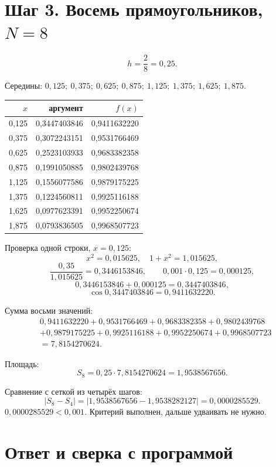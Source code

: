 \documentclass[11pt,a4paper]{article}
\begin{document}
\section*{Шаг 3. Восемь прямоугольников, \(N = 8\)}

\[
h = \frac{2}{8} = 0{,}25.
\]

Середины: \(0{,}125;\ 0{,}375;\ 0{,}625;\ 0{,}875;\ 1{,}125;\ 1{,}375;\ 1{,}625;\ 1{,}875\).

{\small
\begin{center}
\begin{tabular}{@{}r r r@{}}
\toprule
\(x\) & аргумент & \(f(x)\) \\
\midrule
0,125 & 0,3447403846 & 0,9411632220 \\
0,375 & 0,3072243151 & 0,9531766469 \\
0,625 & 0,2523103933 & 0,9683382358 \\
0,875 & 0,1991050885 & 0,9802439768 \\
1,125 & 0,1556077586 & 0,9879175225 \\
1,375 & 0,1224560811 & 0,9925116188 \\
1,625 & 0,0977623391 & 0,9952250674 \\
1,875 & 0,0793836505 & 0,9968507723 \\
\bottomrule
\end{tabular}
\end{center}
}

Проверка одной строки, \(x = 0{,}125\):
\[
x^{2} = 0{,}015625,\quad 1 + x^{2} = 1{,}015625,
\]
\[
\frac{0{,}35}{1{,}015625} = 0{,}3446153846,
\qquad
0{,}001 \cdot 0{,}125 = 0{,}000125,
\]
\[
0{,}3446153846 + 0{,}000125 = 0{,}3447403846,
\]
\[
\cos 0{,}3447403846 = 0{,}9411632220.
\]

Сумма восьми значений:
\begin{align*}
&0{,}9411632220 + 0{,}9531766469 + 0{,}9683382358 + 0{,}9802439768 \\
&+ 0{,}9879175225 + 0{,}9925116188 + 0{,}9952250674 + 0{,}9968507723 \\
&= 7{,}8154270624.
\end{align*}

Площадь:
\[
S_{8} = 0{,}25 \cdot 7{,}8154270624 = 1{,}9538567656.
\]

Сравнение с сеткой из четырёх шагов:
\[
|S_{8} - S_{4}| = |1{,}9538567656 - 1{,}9538282127| = 0{,}0000285529.
\]
\(0{,}0000285529 < 0{,}001\). Критерий выполнен, дальше удваивать не нужно.

\section*{Ответ и сверка с программой}
\end{document}
